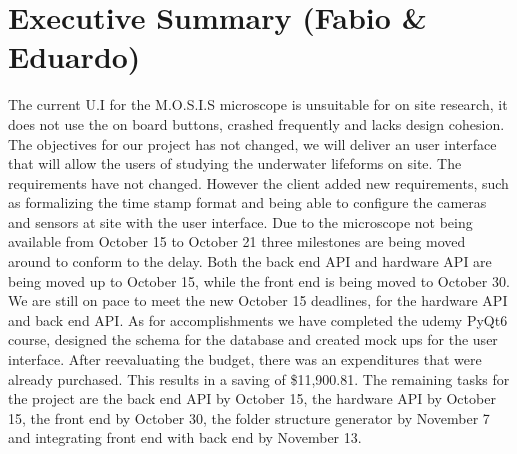 \section*{Executive Summary (Fabio \& Eduardo)}
\begin{spacing}{1.5}

The current U.I for the M.O.S.I.S microscope is unsuitable for on site research, it does not use the on board buttons, crashed frequently and lacks design cohesion. The objectives for our project has not changed, we will deliver an user interface that will allow the users of studying the underwater lifeforms on site. The requirements have not changed. However the client added new requirements, such as formalizing the time stamp format and being able to configure the cameras and sensors at site with the user interface. Due to the microscope not being available from October 15 to October 21  three milestones are being moved around to conform to the delay. Both the back end API and hardware API are being moved up to October 15, while the front end is being moved to October 30. We are still on pace to meet the new October 15 deadlines, for the hardware API and back end API. As for accomplishments we have completed the udemy PyQt6 course, designed the schema for the database and created mock ups for the user interface. After reevaluating the budget, there was an expenditures that were already purchased. This results in a saving of \$11,900.81. The remaining tasks for the project are the back end API by October 15, the hardware API by October 15, the front end by October 30, the folder structure generator by November 7 and integrating front end with back end by November 13.
    
\end{spacing}
\newpage